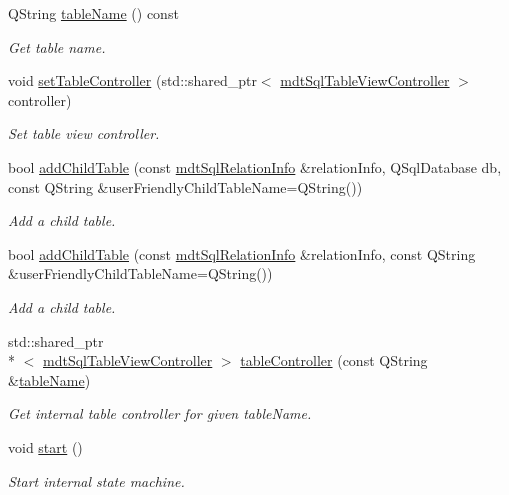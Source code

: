\begin{DoxyCompactItemize}
Q\-String \hyperlink{classmdt_sql_table_widget_a5ebff43d17810531de12c7c3eb208a85}{table\-Name} () const 
\begin{DoxyCompactList}\small\item\em Get table name. \end{DoxyCompactList}\item 
void \hyperlink{classmdt_sql_table_widget_a4855a76905a856cfe82d3ca3f969f17a}{set\-Table\-Controller} (std\-::shared\-\_\-ptr$<$ \hyperlink{classmdt_sql_table_view_controller}{mdt\-Sql\-Table\-View\-Controller} $>$ controller)
\begin{DoxyCompactList}\small\item\em Set table view controller. \end{DoxyCompactList}\item 
bool \hyperlink{classmdt_sql_table_widget_a2a12dbb0c50177aca0ac57edea6af18d}{add\-Child\-Table} (const \hyperlink{classmdt_sql_relation_info}{mdt\-Sql\-Relation\-Info} \&relation\-Info, Q\-Sql\-Database db, const Q\-String \&user\-Friendly\-Child\-Table\-Name=Q\-String())
\begin{DoxyCompactList}\small\item\em Add a child table. \end{DoxyCompactList}\item 
bool \hyperlink{classmdt_sql_table_widget_ae80d69e391c277b7e4563aea2b1c92d6}{add\-Child\-Table} (const \hyperlink{classmdt_sql_relation_info}{mdt\-Sql\-Relation\-Info} \&relation\-Info, const Q\-String \&user\-Friendly\-Child\-Table\-Name=Q\-String())
\begin{DoxyCompactList}\small\item\em Add a child table. \end{DoxyCompactList}\item 
std\-::shared\-\_\-ptr\\*
$<$ \hyperlink{classmdt_sql_table_view_controller}{mdt\-Sql\-Table\-View\-Controller} $>$ \hyperlink{classmdt_sql_table_widget_a3fdef8f8a617da5d93460f328d5a38fb}{table\-Controller} (const Q\-String \&\hyperlink{classmdt_sql_table_widget_a5ebff43d17810531de12c7c3eb208a85}{table\-Name})
\begin{DoxyCompactList}\small\item\em Get internal table controller for given table\-Name. \end{DoxyCompactList}\item 
void \hyperlink{classmdt_sql_table_widget_abfab2f8ad93b0efdb41dd23007db0bbb}{start} ()
\begin{DoxyCompactList}\small\item\em Start internal state machine. \end{DoxyCompactList}\item 

\end{DoxyCompactItemize}
